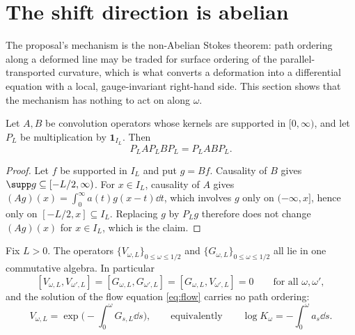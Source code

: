 \section{The shift direction is abelian}\label{sec:abelian}

The proposal's mechanism is the non-Abelian Stokes theorem: path ordering along a
deformed line may be traded for surface ordering of the parallel-transported
curvature, which is what converts a deformation into a differential equation with
a local, gauge-invariant right-hand side. This section shows that the mechanism
has nothing to act on along $\omega$.

\begin{lemma}\label{lem:multiplicative}
Let $A,B$ be convolution operators whose kernels are supported in $[0,\infty)$,
and let $P_L$ be multiplication by $\mathbf1_{I_L}$. Then
\[
 P_LAP_LBP_L=P_LABP_L .
\]
\end{lemma}

\begin{proof}
Let $f$ be supported in $I_L$ and put $g=Bf$. Causality of $B$ gives
$\supp g\subseteq[-L/2,\infty)$. For $x\in I_L$, causality of $A$ gives
$(Ag)(x)=\int_0^\infty a(t)g(x-t)\dd t$, which involves $g$ only on
$(-\infty,x]$, hence only on $[-L/2,x]\subseteq I_L$. Replacing $g$ by
$P_Lg$ therefore does not change $(Ag)(x)$ for $x\in I_L$, which is the claim.
\end{proof}

\begin{theorem}\label{thm:abelian}
Fix $L>0$. The operators $\{V_{\omega,L}\}_{0\leq\omega\leq1/2}$ and
$\{G_{\omega,L}\}_{0\leq\omega\leq1/2}$ all lie in one commutative algebra. In
particular
\[
 [V_{\omega,L},V_{\omega',L}]=[G_{\omega,L},G_{\omega',L}]
 =[G_{\omega,L},V_{\omega',L}]=0
 \qquad\text{for all }\omega,\omega' ,
\]
and the solution of the flow equation \eqref{eq:flow} carries no path ordering:
\begin{equation}\label{eq:exp}
 V_{\omega,L}=\exp\Big(-\int_0^\omega G_{s,L}\dd s\Big),
 \qquad\text{equivalently}\qquad
 \log K_\omega=-\int_0^\omega a_s\dd s .
\end{equation}
\end{theorem}

